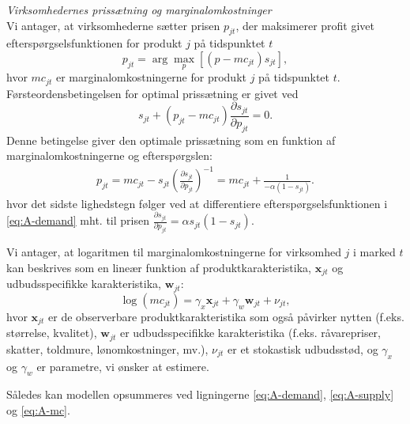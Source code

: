 \documentclass[a4paper,12pt]{article}
\begin{document}
\noindent\emph{Virksomhedernes prissætning og marginalomkostninger}\\
Vi antager, at virksomhederne sætter prisen $p_{jt}$, der maksimerer profit givet efterspørgselsfunktionen for produkt $j$ på tidspunktet $t$
$$ p_{jt} = \arg \max_{p} \left[(p - mc_{jt}) s_{jt} \right],$$
hvor $mc_{jt}$ er marginalomkostningerne for produkt $j$ på tidspunktet $t$. Førsteordensbetingelsen for optimal prissætning er givet ved
\[
s_{jt} + (p_{jt} - mc_{jt}) \frac{\partial s_{jt}}{\partial p_{jt}} = 0.
\]
Denne betingelse giver den optimale prissætning som en funktion af marginalomkostningerne og efterspørgslen:
\begin{align}
    p_{jt} = mc_{jt} - s_{jt}\left(\frac{\partial s_{jt}}{\partial p_{jt}}\right)^{-1} = mc_{jt} + \frac{1}{- \alpha (1 - s_{jt})}. \label{eq:A-supply}    
\end{align}
hvor det sidste lighedstegn følger ved at differentiere efterspørgselsfunktionen i \eqref{eq:A-demand} mht. til prisen $\frac{\partial s_{jt}}{\partial p_{jt}}={\alpha s_{jt}(1 - s_{jt})}$. 

Vi antager, at logaritmen til marginalomkostningerne for virksomhed $j$ i marked $t$ kan beskrives som en lineær funktion af produktkarakteristika, $\mathbf{x}_{jt}$ og udbudsspecifikke karakteristika, $\mathbf{w}_{jt}$:
\begin{equation}
    \log(mc_{jt}) = \gamma_x \mathbf{x}_{jt} + \gamma_w \mathbf{w}_{jt} + \nu_{jt}, \label{eq:A-mc}    
\end{equation}
hvor $\mathbf{x}_{jt}$ er de observerbare produktkarakteristika som også påvirker nytten (f.eks. størrelse, kvalitet), $\mathbf{w}_{jt}$ er udbudsspecifikke karakteristika (f.eks. råvarepriser, skatter, toldmure, lønomkostninger, mv.), $\nu_{jt}$ er et stokastisk udbudsstød, og $\gamma_x$ og $\gamma_w$ er parametre, vi ønsker at estimere. 

Således kan modellen opsummeres ved ligningerne \eqref{eq:A-demand}, \eqref{eq:A-supply} og \eqref{eq:A-mc}.

\vspace{1em}
\noindent\hrulefill


\end{document}
